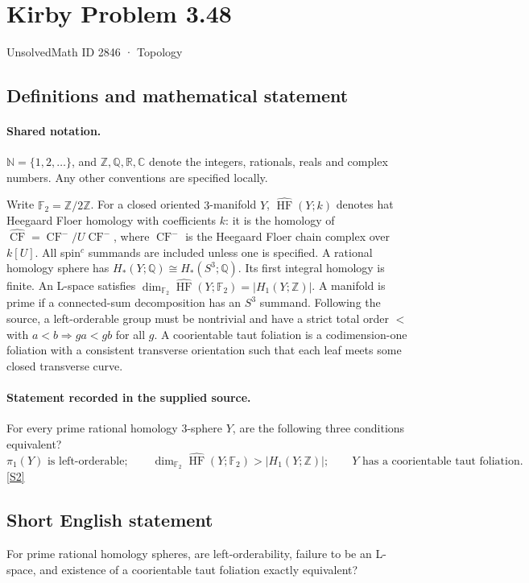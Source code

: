 \documentclass[11pt]{article}
\newcommand{\sref}[2]{\hyperlink{source:#1:#2}{[S#2]}}
\begin{document}
\setcounter{section}{2845}
\section{Kirby Problem 3.48}\label{2846}
{\small\sffamily UnsolvedMath ID 2846 · Topology}
\subsection{Definitions and mathematical statement}

\paragraph{Shared notation.}$\mathbb N=\{1,2,\ldots\}$, and $\mathbb Z,\mathbb Q,\mathbb R,\mathbb C$ denote the integers, rationals, reals and complex numbers. Any other conventions are specified locally.


Write $\mathbb F_2=\mathbb Z/2\mathbb Z$. For a closed oriented $3$-manifold $Y$, $\widehat{\operatorname{HF}}(Y;k)$ denotes hat Heegaard Floer homology with coefficients $k$: it is the homology of $\widehat{\operatorname{CF}}=\operatorname{CF}^-/U\operatorname{CF}^-$, where $\operatorname{CF}^-$ is the Heegaard Floer chain complex over $k[U]$. All spin$^c$ summands are included unless one is specified. A rational homology sphere has $H_*(Y;\mathbb Q)\cong H_*(S^3;\mathbb Q)$. Its first integral homology is finite. An L-space satisfies $\dim_{\mathbb F_2}\widehat{\operatorname{HF}}(Y;\mathbb F_2)=|H_1(Y;\mathbb Z)|$. A manifold is prime if a connected-sum decomposition has an $S^3$ summand. Following the source, a left-orderable group must be nontrivial and have a strict total order $<$ with $a<b\Rightarrow ga<gb$ for all $g$. A coorientable taut foliation is a codimension-one foliation with a consistent transverse orientation such that each leaf meets some closed transverse curve. 
\paragraph{Statement recorded in the supplied source.}
For every prime rational homology $3$-sphere $Y$, are the following three conditions equivalent?
\[
\pi_1(Y)\text{ is left-orderable};\qquad
\dim_{\mathbb F_2}\widehat{\operatorname{HF}}(Y;\mathbb F_2)>|H_1(Y;\mathbb Z)|;\qquad
Y\text{ has a coorientable taut foliation}.
\]
\sref{2846}{2}
\subsection{Short English statement}
For prime rational homology spheres, are left-orderability, failure to be an L-space, and existence of a coorientable taut foliation exactly equivalent?
\end{document}
